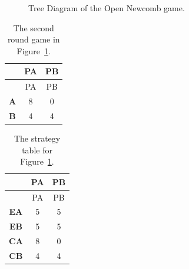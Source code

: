 \documentclass[
  12pt,
  letterpaper,
  DIV=11,
  numbers=noendperiod]{scrreprt}
\begin{document}
\begin{figure}


\caption{\label{fig-against-consequence}Tree Diagram of the Open Newcomb
game.}

\end{figure}%

\begin{longtable}[]{@{}ccc@{}}
\caption{The second round game in
Figure~\ref{fig-against-consequence}.}\label{tbl-against-consequence-short}\tabularnewline
\toprule\noalign{}
& PA & PB \\
\midrule\noalign{}
\endfirsthead
\toprule\noalign{}
& PA & PB \\
\midrule\noalign{}
\endhead
\bottomrule\noalign{}
\endlastfoot
\textbf{A} & 8 & 0 \\
\textbf{B} & 4 & 4 \\
\end{longtable}

\begin{longtable}[]{@{}ccc@{}}
\caption{The strategy table for
Figure~\ref{fig-against-consequence}.}\label{tbl-against-consequence-long}\tabularnewline
\toprule\noalign{}
& PA & PB \\
\midrule\noalign{}
\endfirsthead
\toprule\noalign{}
& PA & PB \\
\midrule\noalign{}
\endhead
\bottomrule\noalign{}
\endlastfoot
\textbf{EA} & 5 & 5 \\
\textbf{EB} & 5 & 5 \\
\textbf{CA} & 8 & 0 \\
\textbf{CB} & 4 & 4 \\
\end{longtable}
\end{document}
